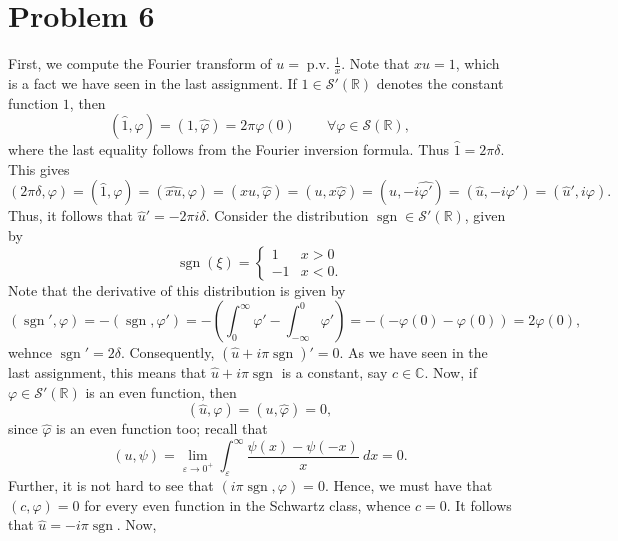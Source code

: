 \documentclass[10pt]{amsart}
\theoremstyle{thmstyle}
\theoremstyle{defstyle}
\newcommand{\R}{\mathbb{R}}
\newcommand{\bbC}{\mathbb{C}}
\newcommand{\sgn}{\operatorname{sgn}}
\newcommand{\scrS}{\mathscr S}
\newcommand{\wh}[1]{\widehat{#1}}
\newcommand{\pv}{\operatorname{p.v.}}
\begin{document}
\section{Problem 6}

First, we compute the Fourier transform of $u = \pv\frac{1}{x}$. Note that $xu = 1$, which is a fact we have seen in the last assignment. If $1\in\scrS'(\R)$ denotes the constant function $1$, then 
\begin{equation*}
    (\wh 1, \varphi) = (1,\wh\varphi) = 2\pi\varphi(0)\qquad~\forall\varphi\in\scrS(\R),
\end{equation*}
where the last equality follows from the Fourier inversion formula. Thus $\wh 1 = 2\pi\delta$. This gives 
\begin{equation*}
    (2\pi\delta, \varphi) = (\wh 1, \varphi) = (\wh{xu},\varphi) = (xu,\wh\varphi) = (u, x\wh\varphi) = (u, -i\wh{\varphi'}) = (\wh u, -i\varphi') = (\wh u', i\varphi).
\end{equation*}
Thus, it follows that $\wh u' = -2\pi i\delta$. Consider the distribution $\sgn\in\scrS'(\R)$, given by 
\begin{equation*}
    \sgn(\xi) = 
    \begin{cases}
        1 & x > 0\\
        -1 & x < 0.
    \end{cases}
\end{equation*}
Note that the derivative of this distribution is given by 
\begin{equation*}
    (\sgn', \varphi) = -(\sgn, \varphi') = -\left(\int_0^\infty\varphi' - \int_{-\infty}^0 \varphi'\right) = -\left(-\varphi(0) - \varphi(0)\right) = 2\varphi(0),
\end{equation*}
wehnce $\sgn' = 2\delta$. Consequently, $(\wh u + i\pi\sgn)' = 0$. As we have seen in the last assignment, this means that $\wh u + i\pi\sgn$ is a constant, say $c\in\bbC$. Now, if $\varphi\in\scrS'(\R)$ is an even function, then 
\begin{equation*}
    (\wh u, \varphi) = (u,\wh\varphi) = 0,
\end{equation*}
since $\wh\varphi$ is an even function too; recall that 
\begin{equation*}
    (u,\psi) = \lim_{\varepsilon\to0^+}\int_{\varepsilon}^\infty\frac{\psi(x) - \psi(-x)}{x}~dx = 0.
\end{equation*}
Further, it is not hard to see that $(i\pi\sgn, \varphi) = 0$. Hence, we must have that $(c,\varphi) = 0$ for every even function in the Schwartz class, whence $c = 0$. It follows that $\wh u = -i\pi\sgn$. Now, 
\end{document}
